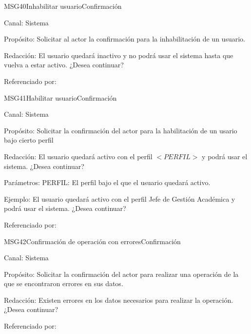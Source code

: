

\begin{mensaje}{MSG40}{Inhabilitar usuario}{Confirmación}
	\item[Canal:] Sistema
	\item[Propósito:] Solicitar al actor la confirmación para la inhabilitación de un usuario.
	\item[Redacción:] El usuario quedará inactivo y no podrá usar el sistema hasta que vuelva a estar activo. ¿Desea continuar? \item[Referenciado por:] 
\end{mensaje}

\begin{mensaje}{MSG41}{Habilitar usuario}{Confirmación}
	\item[Canal:] Sistema
	\item[Propósito:] Solicitar la confirmación del actor para la habilitación de un usario bajo cierto perfil
	\item[Redacción:] El usuario quedará activo con el perfil $<PERFIL>$ y podrá usar el sistema. ¿Desea continuar?
	\item[Parámetros:] PERFIL: El perfil bajo el que el usuario quedará activo.
	\item[Ejemplo:] El usuario quedará activo con el perfil Jefe de Gestión Académica y podrá usar el sistema. ¿Desea continuar?
	\item[Referenciado por:] 
\end{mensaje}

\begin{mensaje}{MSG42}{Confirmación de operación con errores}{Confirmación}
	\item[Canal:] Sistema
	\item[Propósito:] Solicitar la confirmación del actor para realizar una operación de la que se encontraron errores en sus datos.
	\item[Redacción:] Existen errores en los datos necesarios para realizar la operación. ¿Desea continuar?
	\item[Referenciado por:] %
\end{mensaje}

